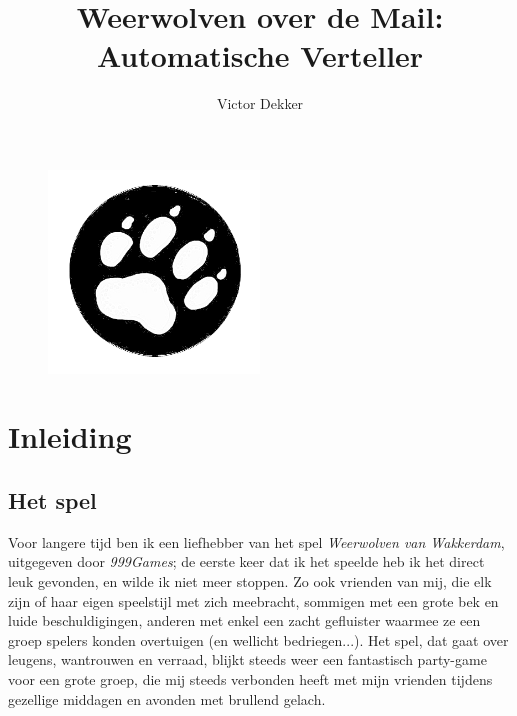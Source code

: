 \documentclass[12pt]{article}
\author{Victor Dekker}
\title{Weerwolven over de Mail:\\Automatische Verteller}
\begin{document}
\titlespacing{\subsubsection}{0in}{0.2in}{0in}

\maketitle

\begin{figure}[h!]
  \centering
  \includegraphics[width=0.5\textwidth]{Welp2.png}
\end{figure}

\newpage
\tableofcontents
\newpage

\section{Inleiding}

  \subsection{Het spel}

    Voor langere tijd ben ik een liefhebber van het spel \emph{Weerwolven van Wakkerdam}, uitgegeven door \emph{999Games}; de eerste keer dat ik het speelde heb ik het direct leuk gevonden, en wilde ik niet meer stoppen. Zo ook vrienden van mij, die elk zijn of haar eigen speelstijl met zich meebracht, sommigen met een grote bek en luide beschuldigingen, anderen met enkel een zacht gefluister waarmee ze een groep spelers konden overtuigen (en wellicht bedriegen...). Het spel, dat gaat over leugens, wantrouwen en verraad, blijkt steeds weer een fantastisch party-game voor een grote groep, die mij steeds verbonden heeft met mijn vrienden tijdens gezellige middagen en avonden met brullend gelach.
\end{document}
